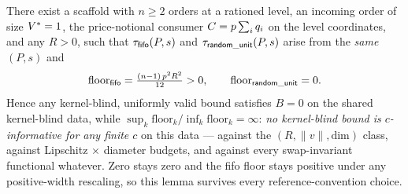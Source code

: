 
\begin{lemma}
\label{lem:g2-2}
There exist a scaffold with $n \ge 2$ orders at a rationed level, an incoming
order of size $V^{*} = 1$, the price-notional consumer
$C = p \sum_i q_i$ on the level coordinates, and any $R > 0$, such that
$\tau_{\mathsf{fifo}}(P,s)$ and $\tau_{\mathsf{random\_unit}}(P,s)$ arise from the \emph{same}
$(P,s)$ and
\[
\mathrm{floor}_{\mathsf{fifo}} = \tfrac{(n-1)\,p^2 R^2}{12} > 0,
\qquad
\mathrm{floor}_{\mathsf{random\_unit}} = 0 .
\]
Hence any kernel-blind, uniformly valid bound satisfies $B = 0$ on the shared
kernel-blind data, while $\sup_k \mathrm{floor}_k / \inf_k \mathrm{floor}_k =
\infty$: \emph{no kernel-blind bound is $c$-informative for any finite $c$}
on this data --- against the $(R, \|v\|, \mathrm{dim})$ class, against
Lipschitz $\times$ diameter budgets, and against every swap-invariant
functional whatever. Zero stays zero and the fifo floor stays positive under
any positive-width rescaling, so this lemma survives every
reference-convention choice.
\end{lemma}


